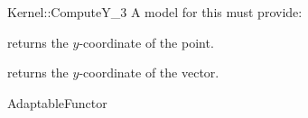\begin{ccRefFunctionObjectConcept}{Kernel::ComputeY_3}
A model for this must provide:


       {returns the $y$-coordinate of the point.}

       {returns the $y$-coordinate of the vector.}

\ccRefines
AdaptableFunctor



\end{ccRefFunctionObjectConcept}
